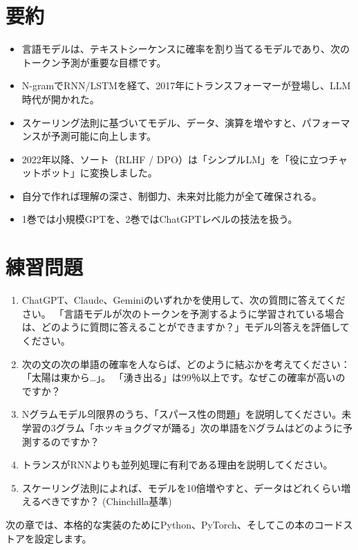 \section{要約}

\begin{itemize}
\item 言語モデルは、テキストシーケンスに確率を割り当てるモデルであり、次のトークン予測が重要な目標です。
\item N-gramでRNN/LSTMを経て、2017年にトランスフォーマーが登場し、LLM時代が開かれた。
\item スケーリング法則に基づいてモデル、データ、演算を増やすと、パフォーマンスが予測可能に向上します。
\item 2022年以降、ソート（RLHF / DPO）は「シンプルLM」を「役に立つチャットボット」に変換しました。
\item 自分で作れば理解の深さ、制御力、未来対比能力が全て確保される。
\item 1巻では小規模GPTを、2巻ではChatGPTレベルの技法を扱う。
\end{itemize}

\section{練習問題}

\begin{enumerate}
\item ChatGPT、Claude、Geminiのいずれかを使用して、次の質問に答えてください。 「言語モデルが次のトークンを予測するように学習されている場合は、どのように質問に答えることができますか？」モデル의答えを評価してください。
\item 次の文の次の単語の確率を人ならば、どのように結ぶかを考えてください：「太陽は東から…」。 「湧き出る」は99％以上です。なぜこの確率が高いのですか？
\item Nグラムモデル의限界のうち、「スパース性の問題」を説明してください。未学習の3グラム「ホッキョクグマが踊る」次の単語をNグラムはどのように予測するのですか？
\item トランスがRNNよりも並列処理に有利である理由を説明してください。
\item スケーリング法則によれば、モデルを10倍増やすと、データはどれくらい増えるべきですか？ (Chinchilla基準)
\end{enumerate}

次の章では、本格的な実装のためにPython、PyTorch、そしてこの本のコードストアを設定します。
